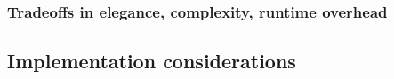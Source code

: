\subsubsection{Tradeoffs in elegance, complexity, runtime overhead}
\label{sec:elegance-and-complexity}


\subsection{Implementation considerations}
\label{sec:evalenv_impl_considerations}



